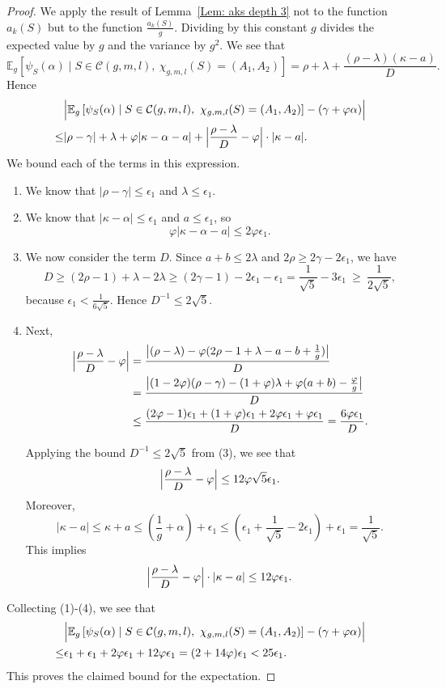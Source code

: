 \documentclass[10pt,a4paper]{amsart}
\def\E{{\mathbb E}}
\newcommand{\cC}{\mathcal{C}}
\renewcommand{\phi}{\varphi}
\begin{document}
\begin{proof}
We apply the result of Lemma~\ref{Lem: aks depth 3} not to the function $a_k(S)$ but to the function $\frac{a_k(S)}{g}$.  Dividing by this constant $g$ divides the expected value by $g$ and the variance by $g^2$.  We see that
\[
\E_g\left[\psi_S(\alpha)\mid S\in \cC(g,m,l),\ \chi_{g,m,l}(S)=(A_1,A_2)\right]
= \rho+\lambda+\frac{(\rho-\lambda)(\kappa-a)}{D}.
\]
Hence
\begin{align*}
& \Bigl| \E_g\left[\psi_S(\alpha)\mid S\in \cC(g,m,l),\ \chi_{g,m,l}(S)=(A_1,A_2)\right]-(\gamma+\phi\alpha)\Bigr| \\
\leq & |\rho-\gamma|+\lambda+\phi|\kappa-\alpha-a|
   +\Bigl|\frac{\rho-\lambda}{D}-\phi\Bigr|\cdot|\kappa-a|.
\end{align*}
We bound each of the terms in this expression.
\begin{enumerate}
    \item We know that $|\rho-\gamma|\leq \epsilon_1$ and $\lambda\leq \epsilon_1$.
    \item We know that $|\kappa-\alpha|\leq \epsilon_1$ and $a\leq \epsilon_1$, so
    \[
    \phi|\kappa-\alpha-a|\leq 2\phi\epsilon_1.
    \]
    \item We now consider the term $D$.  Since $a+b \le 2\lambda$ and $2\rho \ge 2\gamma - 2\epsilon_1$, we have
    \[
    D\geq (2\rho-1)+\lambda-2\lambda\geq (2\gamma-1)-2\epsilon_1-\epsilon_1
    = \frac1{\sqrt5}-3\epsilon_1 \ \ge\ \frac1{2\sqrt5},
    \]
    because $\epsilon_1<\frac{1}{6\sqrt5}$. Hence $D^{-1}\leq 2\sqrt5$.
    \item Next,
    \begin{align*}
    \Bigl|\frac{\rho-\lambda}{D}-\phi\Bigr|
    &=\frac{\big|(\rho-\lambda)-\phi(2\rho-1+\lambda-a-b+\tfrac1g)\big|}{D}\\
    &=\frac{\big|(1-2\phi)(\rho-\gamma)-(1+\phi)\lambda+\phi(a+b)-\tfrac{\phi}{g}\big|}{D}\\
    &\leq \frac{(2\phi-1)\epsilon_1 +(1+\phi)\epsilon_1 +2\phi\epsilon_1+\phi\epsilon_1}{D}
    = \frac{6\phi\epsilon_1}{D}.
    \end{align*}

Applying the bound $D^{-1}\leq 2\sqrt5$ from (3), we see that
    \[
    \Bigl|\frac{\rho-\lambda}{D}-\phi\Bigr|\leq 12\phi\sqrt{5}\epsilon_1.
    \]
    Moreover,
    \[
    |\kappa-a|\leq \kappa +a 
    \leq \left(\frac{1}{g}+\alpha\right) +\epsilon_1 
    \leq \left(\epsilon_1 +\frac1{\sqrt5}-2\epsilon_1\right)+\epsilon_1
    = \frac1{\sqrt5}.
    \]
    This implies
    \[    
    \Bigl|\frac{\rho-\lambda}{D}-\phi\Bigr|\cdot|\kappa-a|
    \leq 12\phi\epsilon_1.
    \]
\end{enumerate}
Collecting (1)-(4), we see that
\begin{align*}
& \Bigl| \E_g\left[\psi_S(\alpha)\mid S\in \cC(g,m,l),\ \chi_{g,m,l}(S)=(A_1,A_2)\right]-(\gamma+\phi\alpha)\Bigr| \\
 \leq & \epsilon_1+\epsilon_1+2\phi\epsilon_1+12\phi \epsilon_1
= (2+14\phi)\epsilon_1 <25\epsilon_1.
\end{align*}
This proves the claimed bound for the expectation.




\end{proof}
\end{document}
